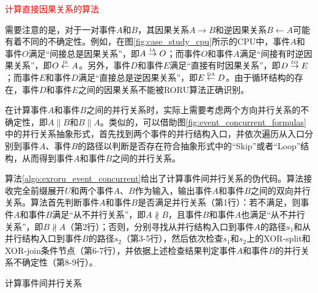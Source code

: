 \textcolor{red}{计算直接因果关系的算法}

需要注意的是，对于一对事件$A$和$B$，其因果关系$A\rightarrow B$和逆因果关系$B\leftarrow A$可能有着不同的不确定性。例如，在图\ref{fig:case_study_cpu}所示的CPU中，事件$A$和事件$O$满足“间接总是因果关系”，即$A\overset{\text{\tiny{IA}}}{\rightarrow}O$；而事件$O$和事件$A$满足“间接有时逆因果关系”，即$O\overset{\text{\tiny{IS}}}{\leftarrow}A$。另外，事件$D$和事件$E$满足“直接有时因果关系”，即$D\overset{\text{\tiny{DS}}}{\rightarrow}E$；而事件$E$和事件$D$满足“直接总是逆因果关系”，即$E\overset{\text{\tiny{DA}}}{\leftarrow}D$。由于循环结构的存在，事件$D$和事件$E$之间的因果关系不能被RORU算法正确识别。

在计算事件$A$和事件$B$之间的并行关系时，实际上需要考虑两个方向并行关系的不确定性，即$A\parallel B$和$B\parallel A$。类似的，可以借助图\ref{fig:event_concurrent_formulas}中的并行关系抽象形式，首先找到两个事件的并行结构入口，并依次遍历从入口分别到事件$A$、事件$B$的路径以判断是否存在符合抽象形式中的“Skip”或者“Loop”结构，从而得到事件$A$和事件$B$之间的并行关系。

算法\ref{algo:exroru_event_concurrent}给出了计算事件间并行关系的伪代码。算法接收完全前缀展开$U$和两个事件$A$、$B$作为输入，输出事件$A$和事件$B$之间的双向并行关系。算法首先判断事件$A$和事件$B$是否满足并行关系（第1行）：若不满足，则事件$A$和事件$B$满足“从不并行关系”，即$A\nparallel B$，且事件$B$和事件$A$也满足“从不并行关系”，即$B\nparallel A$（第2行）；否则，分别寻找从并行结构入口到事件$A$的路径$s_{1}$和从并行结构入口到事件$B$的路径$s_{2}$（第3-5行），然后依次检查$s_{1}$和$s_{2}$上的XOR-split和XOR-join条件节点（第6-7行），并依据上述检查结果判定事件$A$和事件$B$的并行关系不确定性（第8-9行）。

\begin{algorithm}[htbp]
  \LinesNumbered
  \caption{计算事件间并行关系}
  \label{algo:exroru_event_concurrent}
   {
  } 
\end{algorithm}

